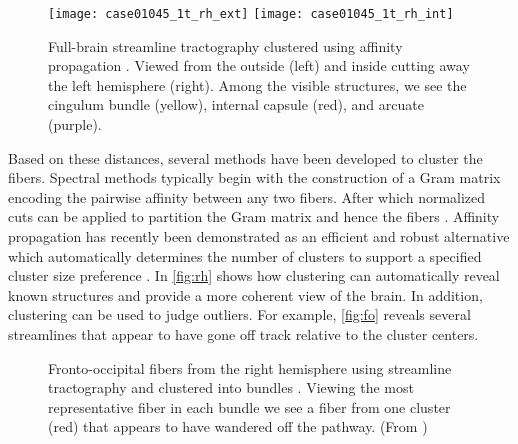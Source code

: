 \documentclass[final,hyperref]{gatech-thesis}
\begin{document}
\begin{figure}[t]
  \centering
  \texttt{[image: case01045\_1t\_rh\_ext]}%
  \texttt{[image: case01045\_1t\_rh\_int]}%
  \caption{Full-brain streamline tractography clustered using affinity
    propagation \cite{Malcolm2009cukf_ext}.  Viewed from the outside (left)
    and inside cutting away the left hemisphere (right).  Among the visible
    structures, we see the cingulum bundle (yellow), internal capsule (red),
    and arcuate (purple).}
  \label{fig:rh}
\end{figure}
Based on these distances, several methods have been developed to cluster the
fibers.
%
Spectral methods typically begin with the construction of a Gram matrix
encoding the pairwise affinity between any two fibers.  After which normalized
cuts can be applied to partition the Gram matrix and hence the fibers
\cite{Brun2004}.
%
Affinity propagation has recently been demonstrated as an efficient and robust
alternative which automatically determines the number of clusters to support a
specified cluster size preference \cite{Leemans2009,Malcolm2009cukf_ext}.
%
In \autoref{fig:rh} shows how clustering can automatically reveal known
structures and provide a more coherent view of the brain.  In addition,
clustering can be used to judge outliers.  For example, \autoref{fig:fo}
reveals several streamlines that appear to have gone off track relative to the
cluster centers.
\begin{figure}[t]
  \centering
  \caption{Fronto-occipital fibers from the right hemisphere using streamline
    tractography and clustered into bundles 
    \cite{Malcolm2009cukf_ext}.  Viewing the most representative fiber in each
    bundle  we see a fiber from one cluster (red) that
    appears to have wandered off the pathway.  (From \cite{Malcolm2009cukf_ext})}
  \label{fig:fo}
\end{figure}
\end{document}
